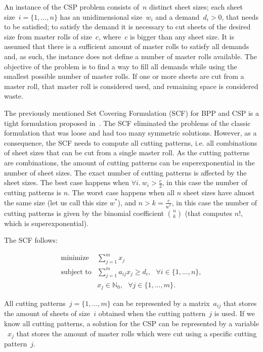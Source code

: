 An instance of the CSP problem consists of~\(n\) distinct sheet sizes; each sheet size~\(i = \{1, \dots, n\}\) has an unidimensional size~\(w_i\) and a demand~\(d_i > 0\), that needs to be satisfied; to satisfy the demand it is necessary to cut sheets of the desired size from master rolls of size~\(c\), where~\(c\) is bigger than any sheet size.
It is assumed that there is a sufficient amount of master rolls to satisfy all demands and, as such, the instance does not define a number of master rolls available.
The objective of the problem is to find a way to fill all demands while using the smallest possible number of master rolls.
If one or more sheets are cut from a master roll, that master roll is considered used, and remaining space is considered waste.

The previously mentioned Set Covering Formulation (SCF) for BPP and CSP is a tight formulation proposed in~\cite{gg-61}.
The SCF eliminated the problems of the classic formulation that was loose and had too many symmetric solutions.
However, as a consequence, the SCF needs to compute all cutting patterns, i.e. all combinations of sheet sizes that can be cut from a single master roll.
As the cutting patterns are combinations, the amount of cutting patterns can be superexponential in the number of sheet sizes. The exact number of cutting patterns is affected by the sheet sizes. The best case happens when \(\forall i.~w_i > \frac{c}{2}\), in this case the number of cutting patterns is \(n\). The worst case happens when all \(n\) sheet sizes have almost the same size (let us call this size \(w^*\)), and \(n > k = \frac{c}{w^*}\), in this case the number of cutting patterns is given by the binomial coefficient \(\binom{n}{k}\) (that computes \(n!\), which is superexponential).

The SCF follows:

\begin{align}
  \mbox{minimize} & \sum_{j=1}^m x_j \label{eq:csp_objfun}\\
\mbox{subject~to} & \sum_{j=1}^m a_{ij} x_j \geq d_i,~~~\forall i \in \{1,...,n\},\label{eq:csp_demand}\\
           & x_j \in \mathbb{N}_0,~~~\forall j \in \{1,...,m\}.\label{eq:csp_x_integer}
\end{align}

All cutting patterns~\(j = \{1, \dots, m\}\) can be represented by a matrix~\(a_{ij}\) that stores the amount of sheets of size~\(i\) obtained when the cutting pattern~\(j\) is used.
If we know all cutting patterns, a solution for the CSP can be represented by a variable ~\(x_j\) that stores the amount of master rolls which were cut using a specific cutting pattern~\(j\).

